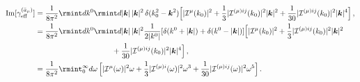 \begin{align}
    \begin{split}
       \text{Im} [\gamma_\mathrm{eff}^{(\bar a_\mu)}]&=\frac{1}{8\pi^2}\rmint dk^0\rmint d|\boldsymbol{k}|\,|\boldsymbol{k}|^2 \, \delta(k_0^2-\boldsymbol{k}^2)\Big[|\mathcal{I}^{\mu}(k_0)|^2+\frac{1}{3}|\mathcal{I}^{(\mu)ij}(k_0)|^2|\boldsymbol{k}|^2+\frac{1}{30}|\mathcal{I}^{(\mu)ij}(k_0)|^2|\boldsymbol{k}|^4\Big]\,,\\ &
    =\frac{1}{8\pi^2}\rmint dk^0\rmint d|\boldsymbol{k}|\,|\boldsymbol{k}|^2 \frac{1}{2|k^0|}[\delta(k^0+|\boldsymbol{k}|)+\delta(k^0-|\boldsymbol{k}|)]\Big[|\mathcal{I}^{\mu}(k_0)|^2+\frac{1}{3}|\mathcal{I}^{(\mu)ij}(k_0)|^2|\boldsymbol{k}|^2\\ &\hspace{3cm}
    \,\,\,\,\,\,\,\,\,\,+\frac{1}{30}|\mathcal{I}^{(\mu)ij}(k_0)|^2|\boldsymbol{k}|^4\Big]\,,\\ &
    =\frac{1}{8\pi^2}\rmint_0^{\infty} d\omega\,\Big[|\mathcal{I}^{\mu}(\omega)|^2\omega+\frac{1}{3}|\mathcal{I}^{(\mu)i}(\omega)|^2\omega^3
    +\frac{1}{30}|\mathcal{I}^{(\mu)ij}(\omega)|^2\omega^5\Big]\,.
    \label{5.42}
    \end{split}
\end{align}
